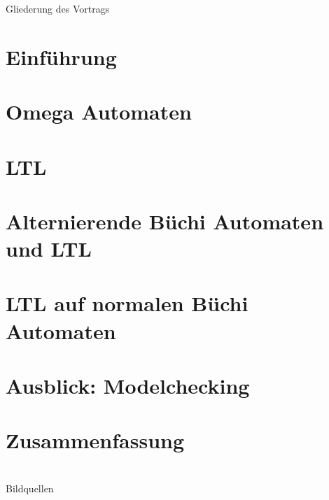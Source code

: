 \documentclass{beamer}
\date{22-26. Februar 2016}
\def\tocname{Gliederung des Vortrags}
\begin{document}
\fontsize{14pt}{14pt}
	
{
\begin{frame}%
	\titlepage
\end{frame}}

\begin{frame}{\tocname}
	\tableofcontents
\end{frame}

\section{Einführung}
\section{Omega Automaten}

\section{LTL}
\section{Alternierende Büchi Automaten und LTL}
\section{LTL auf normalen Büchi Automaten}
 
\section{Ausblick: Modelchecking}
\section{Zusammenfassung}

\section{\bibname}
\begin{frame}[allowframebreaks]{\bibname}
	\AtBeginSection{}
	\nocite{*}
	
	
\end{frame}
\begin{frame}[allowframebreaks]{Bildquellen}
\end{frame}
\end{document}
